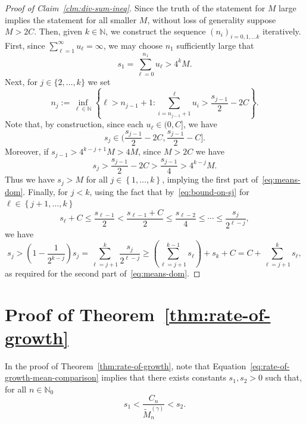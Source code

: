 \documentclass[12pt]{article}
\theoremstyle{definition}
\begin{document}
\begin{proof}[Proof of Claim~\ref{clm:div-sum-ineq}] 
Since the truth of the statement for $M$ large implies the statement for all smaller $M$, without loss of generality suppose $M > 2C$. Then,  given $k \in \mathbb{N}$, we construct the sequence $(n_{i})_{i =0, 1, \ldots k}$ iteratively. First, since $\sum_{\ell =1}^{\infty} u_{\ell} = \infty$, we may choose $n_1$ sufficiently large that 
\begin{equation} \label{eq:initial-sum}
s_{1} = \sum_{\ell=0}^{n_1} u_{\ell} > 4^{k} M. 
\end{equation}
Next, for $j \in \{2, \ldots, k\}$ we set 
\[
n_{j} := \inf_{\ell \in \mathbb{N}}\left\{\ell > n_{j-1} + 1 \colon \sum_{i=n_{j-1} + 1}^{\ell} u_{i} > \frac{s_{j-1}}{2} - 2C\right\}. 
\]
Note that, by construction, since each $u_{\ell} \in (0, C]$, we have 
\begin{equation} \label{eq:bound-on-sj}
s_{j} \in 
\bigg(\frac{s_{j-1}}{2} - 2C, \frac{s_{j-1}}{2} - C\bigg].
\end{equation}
Moreover, if $s_{j-1} > 4^{k-j+1}M > 4M$, since $M > 2C$ we have 
\[
s_{j} > \frac{s_{j-1}}{2} - 2C > \frac{s_{j-1}}{4} > 4^{k-j} M.
\]
Thus we have $s_{j} > M$ for all $j \in \left\{1, \ldots, k\right\}$, implying the first part of~\eqref{eq:means-dom}. Finally, for $j < k$, using the fact that by~\eqref{eq:bound-on-sj} for $\ell \in \left\{j+1, \ldots, k\right\}$
\[
s_{\ell} + C \leq \frac{s_{\ell - 1}}{2} < \frac{s_{\ell - 1} + C}{2} \leq \frac{s_{\ell - 2}}{4} \leq \cdots \leq \frac{s_{j}}{2^{\ell - j}}, 
\]
we have
\[
s_{j} > \left(1 - \frac{1}{2^{k-j}}\right)s_{j} = \sum_{\ell=j+1}^{k}\frac{s_{j}}{2^{\ell - j}} \geq \left(\sum_{\ell = j+1}^{k-1} s_{\ell} \right) + s_{k} + C = C+ \sum_{\ell=j+1}^{k} s_{\ell},
\]
as required for the second part of~\eqref{eq:means-dom}. 
\end{proof}



\section{Proof of Theorem~\ref{thm:rate-of-growth}}
\label{sec:growth-scale}
In the proof of Theorem~\ref{thm:rate-of-growth}, note that
Equation~\eqref{eq:rate-of-growth-mean-comparison} implies that there exists constants $s_1, s_2 > 0$ such that, for all $n \in \mathbb{N}_0$
\begin{equation} \label{eq:rate-of-growth-mean-comparison-2}
s_1 < \frac{C_{n}}{\tilde{M}^{(\gamma)}_{n}} < s_2. 
\end{equation} 
\end{document}
